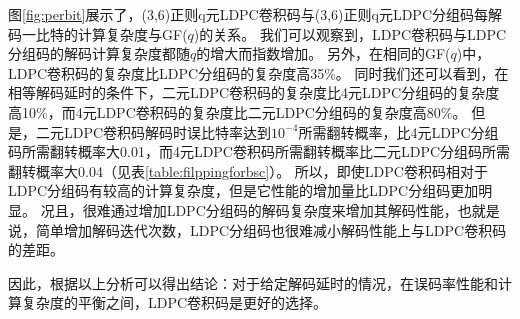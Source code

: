 图\ref{fig:perbit}展示了，(3,6)正则q元LDPC卷积码与(3,6)正则q元LDPC分组码每解码一比特的计算复杂度与GF($q$)的关系。
我们可以观察到，LDPC卷积码与LDPC分组码的解码计算复杂度都随$q$的增大而指数增加。
另外，在相同的GF($q$)中，LDPC卷积码的复杂度比LDPC分组码的复杂度高35\%。
同时我们还可以看到，在相等解码延时的条件下，二元LDPC卷积码的复杂度比4元LDPC分组码的复杂度高10\%，而4元LDPC卷积码的复杂度比二元LDPC分组码的复杂度高80\%。
但是，二元LDPC卷积码解码时误比特率达到$10^{-4}$所需翻转概率，比4元LDPC分组码所需翻转概率大0.01，而4元LDPC卷积码所需翻转概率比二元LDPC分组码所需翻转概率大0.04（见表\ref{table:filppingforbsc}）。
所以，即使LDPC卷积码相对于LDPC分组码有较高的计算复杂度，但是它性能的增加量比LDPC分组码更加明显。
况且，很难通过增加LDPC分组码的解码复杂度来增加其解码性能，也就是说，简单增加解码迭代次数，LDPC分组码也很难减小解码性能上与LDPC卷积码的差距。

因此，根据以上分析可以得出结论：对于给定解码延时的情况，在误码率性能和计算复杂度的平衡之间，LDPC卷积码是更好的选择。












